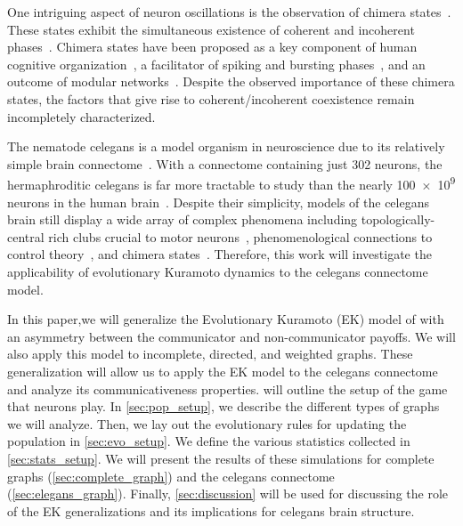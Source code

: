 \documentclass[pdflatex,lineno,referee,sn-mathphys-ay]{sn-jnl}
\begin{document}
One intriguing aspect of neuron oscillations
is the observation of chimera states~\citep
[\eg{}][and references therein]{majhi2019chimera}.
These states exhibit the simultaneous existence
of coherent and incoherent phases~\citep{abrams2004chimera}.
Chimera states have been proposed
as a key component of human cognitive organization~\citep{bansal2019cognitive},
a facilitator of spiking and bursting phases~\citep{santos2017chimera},
and an outcome of modular networks~\citep{hizanidis2016chimera}.
Despite the observed importance of these chimera states,
the factors that give rise to coherent/incoherent coexistence
remain incompletely characterized.

The nematode \gls{celegans}
is a model organism in neuroscience due to
its relatively simple brain connectome~\citep{cook2019whole}.
With a connectome containing just \num{302} neurons,
the hermaphroditic \gls{celegans} is far more tractable to study
than the nearly \num{100e9} neurons
in the human brain~\citep[\eg][]{von2016search}.
Despite their simplicity, models of the \gls{celegans} brain
still display a wide array of complex phenomena including
topologically-central rich clubs
crucial to motor neurons~\citep{towlson2013rich},
phenomenological connections to control theory~\citep{yan2017network},
and chimera states~\citep{hizanidis2016chimera}.
Therefore, this work will investigate the applicability
of evolutionary Kuramoto dynamics to the \gls{celegans}
connectome model.

In this paper,we will generalize
the Evolutionary Kuramoto (EK) model
of \citet{tripp2022evolutionary} with an asymmetry between
the communicator and non-communicator payoffs.
We will also apply this model to incomplete, directed, and weighted graphs.
These generalization will allow us to apply the EK model
to the \gls{celegans} connectome
and analyze its communicativeness properties.
 will outline the setup of the game that neurons play.
In \cref{sec:pop_setup}, we describe the different types
of graphs we will analyze.
Then, we lay out the evolutionary rules for updating the population
in \cref{sec:evo_setup}.
We define the various statistics collected in \cref{sec:stats_setup}.
We will present the results of these simulations for
complete graphs (\cref{sec:complete_graph})
and the \gls{celegans} connectome (\cref{sec:elegans_graph}).
Finally, \cref{sec:discussion} will be used
for discussing the role of the EK generalizations
and its implications for \gls{celegans} brain structure.
\end{document}
